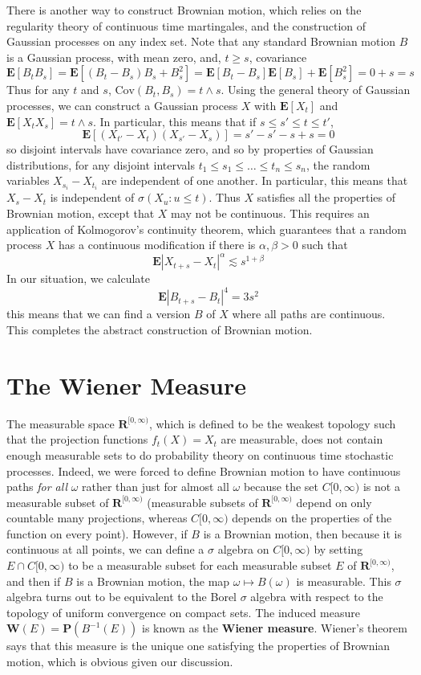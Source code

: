 There is another way to construct Brownian motion, which relies on the regularity theory of continuous time martingales, and the construction of Gaussian processes on any index set. Note that any standard Brownian motion $B$ is a Gaussian process, with mean zero, and, $t \geq s$, covariance
%
\[ \mathbf{E}[B_tB_s] = \mathbf{E}[(B_t - B_s)B_s + B_s^2] = \mathbf{E}[B_t - B_s] \mathbf{E}[B_s] + \mathbf{E}[B_s^2] = 0 + s = s \]
%
Thus for any $t$ and $s$, $\text{Cov}(B_t,B_s) = t \wedge s$. Using the general theory of Gaussian processes, we can construct a Gaussian process $X$ with $\mathbf{E}[X_t]$ and $\mathbf{E}[X_tX_s] = t \wedge s$. In particular, this means that if $s \leq s' \leq t \leq t'$,
%
\[ \mathbf{E}[(X_{t'} - X_t)(X_{s'} - X_s)] = s' - s' - s + s = 0 \]
%
so disjoint intervals have covariance zero, and so by properties of Gaussian distributions, for any disjoint intervals $t_1 \leq s_1 \leq \dots \leq t_n \leq s_n$, the random variables $X_{s_i} - X_{t_i}$ are independent of one another. In particular, this means that $X_s - X_t$ is independent of $\sigma(X_u: u \leq t)$. Thus $X$ satisfies all the properties of Brownian motion, except that $X$ may not be continuous. This requires an application of Kolmogorov's continuity theorem, which guarantees that a random process $X$ has a continuous modification if there is $\alpha, \beta > 0$ such that
%
\[ \mathbf{E}|X_{t+s} - X_t|^\alpha \lesssim s^{1 + \beta} \]
%
In our situation, we calculate
%
\[ \mathbf{E} |B_{t+s} - B_t|^4 = 3s^2 \]
%
this means that we can find a version $B$ of $X$ where all paths are continuous. This completes the abstract construction of Brownian motion.

\section{The Wiener Measure}

The measurable space $\mathbf{R}^{[0,\infty)}$, which is defined to be the weakest topology such that the projection functions $f_t(X) = X_t$ are measurable, does not contain enough measurable sets to do probability theory on continuous time stochastic processes. Indeed, we were forced to define Brownian motion to have continuous paths {\it for all} $\omega$ rather than just for almost all $\omega$ because the set $C[0,\infty)$ is not a measurable subset of $\mathbf{R}^{[0,\infty)}$ (measurable subsets of $\mathbf{R}^{[0,\infty)}$ depend on only countable many projections, whereas $C[0,\infty)$ depends on the properties of the function on every point). However, if $B$ is a Brownian motion, then because it is continuous at all points, we can define a $\sigma$ algebra on $C[0,\infty)$ by setting $E \cap C[0,\infty)$ to be a measurable subset for each measurable subset $E$ of $\mathbf{R}^{[0,\infty)}$, and then if $B$ is a Brownian motion, the map $\omega \mapsto B(\omega)$ is measurable. This $\sigma$ algebra turns out to be equivalent to the Borel $\sigma$ algebra with respect to the topology of uniform convergence on compact sets. The induced measure $\mathbf{W}(E) = \mathbf{P}(B^{-1}(E))$ is known as the {\bf Wiener measure}. Wiener's theorem says that this measure is the unique one satisfying the properties of Brownian motion, which is obvious given our discussion.

